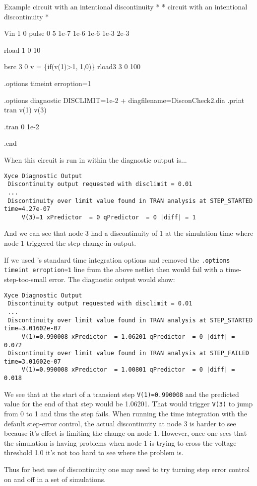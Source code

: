 \begin{NetlistFigure}{Example circuit with an intentional discontinuity}
*
* circuit with an intentional discontinuity 
*

Vin 1 0 pulse 0 5 1e-7 1e-6 1e-6 1e-3 2e-3

rload 1 0 10


bsrc 3 0 v = \{if(v(1)>1, 1,0)\}
rload3 3 0 100


.options timeint erroption=1

.options diagnostic DISCLIMIT=1e-2 
+ diagfilename=DisconCheck2.dia
.print tran v(1) v(3)

.tran 0 1e-2

.end

\end{NetlistFigure}

When this circuit is run in \Xyce{} within the diagnostic output is...
\begin{verbatim}
Xyce Diagnostic Output
 Discontinuity output requested with disclimit = 0.01
 ...
 Discontinuity over limit value found in TRAN analysis at STEP_STARTED time=4.27e-07
     V(3)=1 xPredictor  = 0 qPredictor  = 0 |diff| = 1
\end{verbatim}

And we can see that node 3 had a discontinuity of 1 at the simulation time where
node 1 triggered the step change in output.

If we used \Xyce{}'s standard time integration options and removed the \texttt{.options timeint erroption=1}
line from the above netlist then \Xyce{} would fail with a time-step-too-small error.  The
diagnostic output would show:



\begin{verbatim}
Xyce Diagnostic Output
 Discontinuity output requested with disclimit = 0.01
 ...
 Discontinuity over limit value found in TRAN analysis at STEP_STARTED time=3.01602e-07
     V(1)=0.990008 xPredictor  = 1.06201 qPredictor  = 0 |diff| = 0.072
 Discontinuity over limit value found in TRAN analysis at STEP_FAILED time=3.01602e-07
     V(1)=0.990008 xPredictor  = 1.00801 qPredictor  = 0 |diff| = 0.018
\end{verbatim}
We see that at the start of a transient step \texttt{V(1)=0.990008} and the predicted 
value for the end of that step would be 1.06201.  That would trigger \texttt{V(3)} to jump
from 0 to 1 and thus the step fails.  When running the time integration with the default 
step-error control, the actual discontinuity at node 3 is harder to see because it's effect
is limiting the change on node 1.  However, once one sees that the simulation is having 
problems when node 1 is trying to cross the voltage threshold 1.0 it's not too hard to see
where the problem is. 

Thus for best use of discontinuity one may need to try turning step error control on and
off in a set of simulations.

\label{SimulationIssues}

